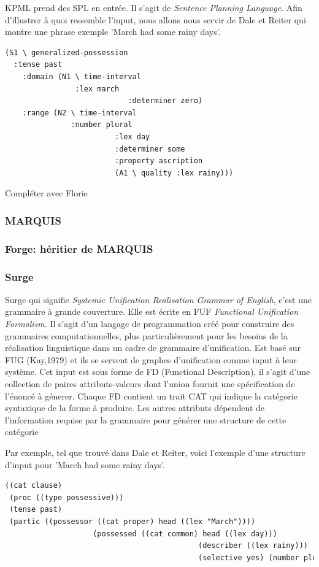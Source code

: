 KPML prend des SPL en entrée. Il s'agit de \emph{Sentence Planning Language}. Afin d'illustrer à quoi ressemble l'input, nous allons nous servir de Dale et Reiter qui montre une phrase exemple 'March had some rainy days'.
\begin{lstlisting}[language=Xml, caption=SPL: input de KPML]
(S1 \ generalized-possession
  :tense past 
	:domain (N1 \ time-interval
	            :lex march
							:determiner zero)
	:range (N2 \ time-interval
	           :number plural
						 :lex day
						 :determiner some
						 :property ascription
						 (A1 \ quality :lex rainy)))
\end{lstlisting}
Compléter avec Florie

\subsubsection{MARQUIS}
\citep{WannerMARQUISGENERATIONUSERTAILORED2010}

\subsubsection{Forge: héritier de MARQUIS}
\citep{DBLP:conf/semeval/MilleCBW17}

\subsubsection{Surge}
\citep{Elhadad98surge:a}
Surge qui signifie \emph{Systemic Unification Realisation Grammar of English}, c'est une grammaire à grande couverture. Elle est écrite en FUF \emph{Functional Unification Formalism}. Il s'agit d'un langage de programmation créé pour construire des grammaires computationnelles, plus particulièrement pour les besoins de la réalisation linguistique dans un cadre de grammaire d'unification. Est basé sur FUG (Kay,1979) et ils se servent de graphes d'unification comme input à leur système. Cet input est sous forme de FD (Functional Description), il s'agit d'une collection de paires attributs-valeurs dont l'union fournit une spécification de l'énoncé à génerer. Chaque FD contient un trait CAT qui indique la catégorie syntaxique de la forme à produire. Les autres attributs dépendent de l'information requise par la grammaire pour générer une structure de cette catégorie

Par exemple, tel que trouvé dans Dale et Reiter, voici l'exemple d'une structure d'input pour 'March had some rainy days'.
\begin{lstlisting}[language=Xml, caption=FD: input de Surge]
((cat clause)
 (proc ((type possessive)))
 (tense past)
 (partic ((possessor ((cat proper) head ((lex "March"))))
					(possessed ((cat common) head ((lex day)))
											(describer ((lex rainy)))
											(selective yes) (number plural)))))
\end{lstlisting}

